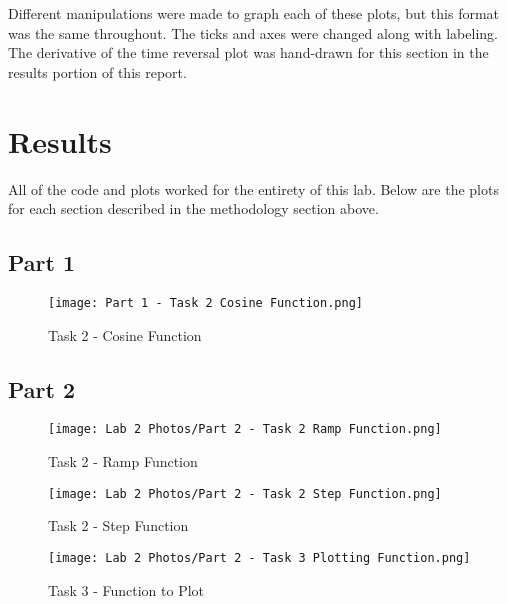 \documentclass[12pt]{report}
\begin{document}
\noindent Different manipulations were made to graph each of these plots, but this format was the same throughout. The ticks and axes were changed along with labeling. \\

\noindent The derivative of the time reversal plot was hand-drawn for this section in the results portion of this report. 

\newpage
\section{Results}
All of the code and plots worked for the entirety of this lab. Below are the plots for each section described in the methodology section above.  

\subsection{Part 1}

\begin{figure}[ht]
\begin{center}
\texttt{[image: Part 1 - Task 2 Cosine Function.png]}
\caption{Task 2 - Cosine Function}
\end{center}
\end{figure}

\subsection{Part 2}

\begin{figure}[ht]
\begin{center}
\texttt{[image: Lab 2 Photos/Part 2 - Task 2 Ramp Function.png]}
\caption{Task 2 - Ramp Function}
\end{center}
\end{figure}

\begin{figure}[ht]
\begin{center}
\texttt{[image: Lab 2 Photos/Part 2 - Task 2 Step Function.png]}
\caption{Task 2 - Step Function}
\end{center}
\end{figure}

\newpage
\begin{figure}[ht]
\begin{center}
\texttt{[image: Lab 2 Photos/Part 2 - Task 3 Plotting Function.png]}
\caption{Task 3 - Function to Plot}
\end{center}
\end{figure}
\clearpage
\end{document}
